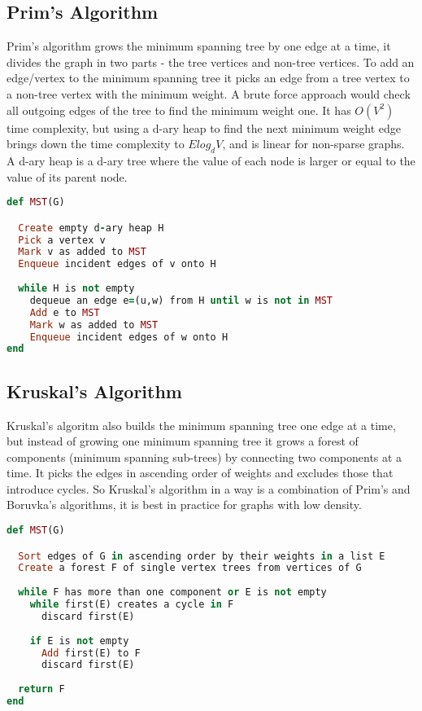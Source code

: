 \documentclass{report}
\theoremstyle{plain}
\theoremstyle{definition}
\theoremstyle{remark}
\begin{document}
\subsection*{Prim's Algorithm}

Prim's algorithm grows the minimum spanning tree by one edge at a time, it divides the graph in two parts - the tree vertices and non-tree vertices. To add an edge/vertex to the minimum spanning tree it picks an edge from a tree vertex to a non-tree vertex with the minimum weight. A brute force approach would check all outgoing edges of the tree to find the minimum weight one. It has $O(V^2)$ time complexity, but using a d-ary heap to find the next minimum weight edge brings down the time complexity to $Elog_dV$, and is linear for non-sparse graphs. A d-ary heap is a d-ary tree where the value of each node is larger or equal to the value of its parent node.

\begin{lstlisting}[language=Ruby]
def MST(G)

  Create empty d-ary heap H
  Pick a vertex v
  Mark v as added to MST
  Enqueue incident edges of v onto H
  
  while H is not empty
    dequeue an edge e=(u,w) from H until w is not in MST
    Add e to MST
    Mark w as added to MST
    Enqueue incident edges of w onto H
end
\end{lstlisting}

\subsection*{Kruskal's Algorithm}
Kruskal's algoritm also builds the minimum spanning tree one edge at a time, but instead of growing one minimum spanning tree it grows a forest of components (minimum spanning sub-trees) by connecting two components at a time. It picks the edges in ascending order of weights and excludes those that introduce cycles. So Kruskal's algorithm in a way is a combination of Prim's and Boruvka's algorithms, it is best in practice for graphs with low density.

\begin{lstlisting}[language=Ruby]
def MST(G)

  Sort edges of G in ascending order by their weights in a list E
  Create a forest F of single vertex trees from vertices of G
  
  while F has more than one component or E is not empty
    while first(E) creates a cycle in F
      discard first(E)
      
    if E is not empty
      Add first(E) to F
      discard first(E)      
  
  return F
end
\end{lstlisting}
\end{document}
